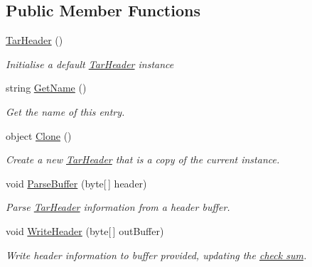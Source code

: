 \subsection*{Public Member Functions}
\begin{DoxyCompactItemize}
\item 
\hyperlink{class_i_c_sharp_code_1_1_sharp_zip_lib_1_1_tar_1_1_tar_header_ac1b629c9653ea5550976deec33153b99}{Tar\+Header} ()
\begin{DoxyCompactList}\small\item\em Initialise a default \hyperlink{class_i_c_sharp_code_1_1_sharp_zip_lib_1_1_tar_1_1_tar_header}{Tar\+Header} instance \end{DoxyCompactList}\item 
string \hyperlink{class_i_c_sharp_code_1_1_sharp_zip_lib_1_1_tar_1_1_tar_header_a93f0d6646c4484a39bc8f0bc9a97fde4}{Get\+Name} ()
\begin{DoxyCompactList}\small\item\em Get the name of this entry. \end{DoxyCompactList}\item 
object \hyperlink{class_i_c_sharp_code_1_1_sharp_zip_lib_1_1_tar_1_1_tar_header_ab3e430e779c683510f1215a13931a066}{Clone} ()
\begin{DoxyCompactList}\small\item\em Create a new \hyperlink{class_i_c_sharp_code_1_1_sharp_zip_lib_1_1_tar_1_1_tar_header}{Tar\+Header} that is a copy of the current instance. \end{DoxyCompactList}\item 
void \hyperlink{class_i_c_sharp_code_1_1_sharp_zip_lib_1_1_tar_1_1_tar_header_ad3a1c81d65536a98023cfc858d21796d}{Parse\+Buffer} (byte\mbox{[}$\,$\mbox{]} header)
\begin{DoxyCompactList}\small\item\em Parse \hyperlink{class_i_c_sharp_code_1_1_sharp_zip_lib_1_1_tar_1_1_tar_header}{Tar\+Header} information from a header buffer. \end{DoxyCompactList}\item 
void \hyperlink{class_i_c_sharp_code_1_1_sharp_zip_lib_1_1_tar_1_1_tar_header_acf04c2c4386677777879d4b68de06cab}{Write\+Header} (byte\mbox{[}$\,$\mbox{]} out\+Buffer)
\begin{DoxyCompactList}\small\item\em \textquotesingle{}Write\textquotesingle{} header information to buffer provided, updating the \hyperlink{class_i_c_sharp_code_1_1_sharp_zip_lib_1_1_tar_1_1_tar_header_a1075620bf99c3b7ddea25b3ba2718a3d}{check sum}. \end{DoxyCompactList}\item 

\end{DoxyCompactItemize}
